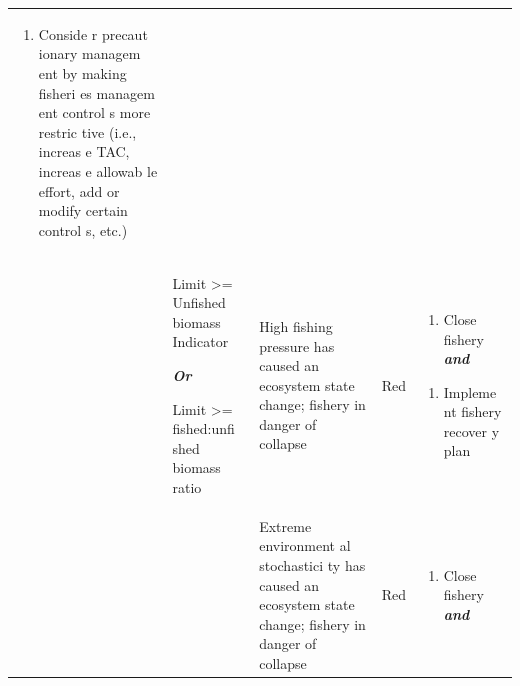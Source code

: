\documentclass[]{book}
\providecommand{\tightlist}{%
  \setlength{\itemsep}{0pt}\setlength{\parskip}{0pt}}
\begin{document}
\begin{longtable}[]{@{}lllll@{}}
\begin{minipage}[t]{0.19\columnwidth}
\begin{enumerate}
\def\labelenumi{\arabic{enumi}.}
\tightlist
\item
  Conside r precaut ionary managem ent by making fisheri es managem ent
  control s more restric tive (i.e., increas e TAC, increas e allowab le
  effort, add or modify certain control s, etc.)
\end{enumerate}\strut
\end{minipage}\tabularnewline
\begin{minipage}[t]{0.19\columnwidth}\raggedright\strut
\strut
\end{minipage} & \begin{minipage}[t]{0.19\columnwidth}\raggedright\strut
Limit \textgreater{}= Unfished biomass Indicator

\textbf{\emph{Or}}

Limit \textgreater{}= fished:unfi shed biomass ratio\strut
\end{minipage} & \begin{minipage}[t]{0.19\columnwidth}\raggedright\strut
High fishing pressure has caused an ecosystem state change; fishery in
danger of collapse\strut
\end{minipage} & \begin{minipage}[t]{0.19\columnwidth}\raggedright\strut
Red\strut
\end{minipage} & \begin{minipage}[t]{0.19\columnwidth}\raggedright\strut
\begin{enumerate}
\def\labelenumi{\arabic{enumi}.}
\tightlist
\item
  Close fishery \textbf{\emph{and} }
\end{enumerate}

\begin{enumerate}
\def\labelenumi{\arabic{enumi}.}
\tightlist
\item
  Impleme nt fishery recover y plan
\end{enumerate}\strut
\end{minipage}\tabularnewline
\begin{minipage}[t]{0.19\columnwidth}\raggedright\strut
\strut
\end{minipage} & \begin{minipage}[t]{0.19\columnwidth}\raggedright\strut
\strut
\end{minipage} & \begin{minipage}[t]{0.19\columnwidth}\raggedright\strut
Extreme environment al stochastici ty has caused an ecosystem state
change; fishery in danger of collapse\strut
\end{minipage} & \begin{minipage}[t]{0.19\columnwidth}\raggedright\strut
Red\strut
\end{minipage} & \begin{minipage}[t]{0.19\columnwidth}\raggedright\strut
\begin{enumerate}
\def\labelenumi{\arabic{enumi}.}
\tightlist
\item
  Close fishery \textbf{\emph{and} }
\end{enumerate}


\end{minipage}
\end{longtable}
\end{document}

